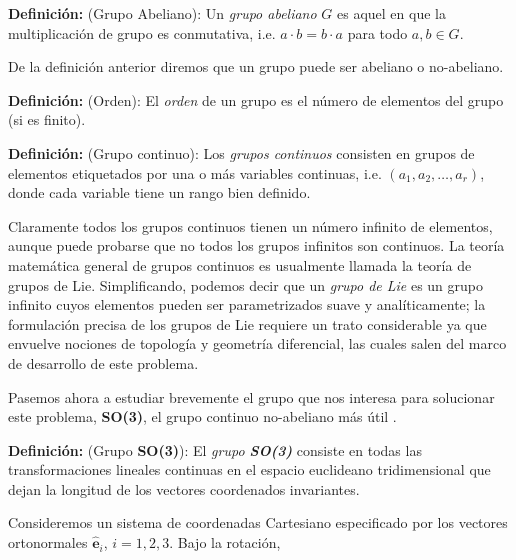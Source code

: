 \documentclass[a4paper,10pt]{article}
\numberwithin{equation}{section}
\newcommand{\definicion}{\textbf{Definición: }}
\begin{document}
\definicion (Grupo Abeliano): Un \emph{grupo abeliano} $G$ es aquel en que la multiplicación
de grupo es conmutativa, i.e. $a\cdot b = b\cdot a$ para todo $a,b \in G$.

\vspace{.3cm}

De la definición anterior diremos que un grupo puede ser abeliano o no-abeliano.

\vspace{.3cm}

\definicion (Orden): El \emph{orden} de un grupo es el número de elementos del grupo 
(si es finito). 

\vspace{.3cm}

\definicion (Grupo continuo): Los \emph{grupos continuos} consisten en grupos de 
elementos etiquetados por una o más variables continuas, i.e. $(a_1,a_2,\dots,a_r)$, 
donde cada variable tiene un rango bien definido.

\vspace{.3cm}

Claramente todos los grupos continuos tienen un número infinito de elementos, aunque 
puede probarse que no todos los grupos infinitos son continuos. La teoría matemática 
general de grupos continuos es usualmente llamada la teoría de grupos de Lie. Simplificando,
podemos decir que un \emph{grupo de Lie} es un grupo infinito cuyos elementos pueden 
ser parametrizados suave y analíticamente; la formulación precisa de los grupos de 
Lie requiere un trato considerable ya que envuelve nociones de topología y geometría 
diferencial, las cuales salen del marco de desarrollo de este problema.

\vspace{.3cm}

Pasemos ahora a estudiar brevemente el grupo que nos interesa para solucionar este 
problema, \textbf{SO(3)}, el grupo continuo no-abeliano más útil \cite{tung}.

\vspace{.3cm}

\definicion (Grupo \textbf{SO(3)}): El \emph{grupo \textbf{SO(3)}} consiste en todas 
las transformaciones lineales continuas en el espacio euclideano tridimensional 
que dejan la longitud de los vectores coordenados invariantes. 

\vspace{.3cm}

Consideremos un sistema de coordenadas Cartesiano especificado por los vectores 
ortonormales $\hat{\mathbf{e}}_i$, $i = 1,2,3$. Bajo la rotación,
\end{document}
